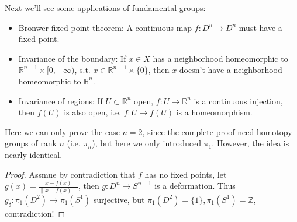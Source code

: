 Next we'll see some applications of fundamental groups:
\begin{itemize}
	\item Bronwer fixed point theorem: A continuous map $f: D^n \to D^n$ must
		have a fixed point.
	\item Invariance of the boundary: If $x\in X$ has a neighborhood homeomorphic
		to $\mathbb{R}^{n-1}\times [0, +\infty)$, s.t.
		$x\in \mathbb{R}^{n-1} \times \{0\}$, then $x$ doesn't have a neighborhood
		homeomorphic to $\mathbb{R}^{n}$.
	\item Invariance of regions: If $U \subset \mathbb{R}^{n}$ open,
		$f: U\to \mathbb{R}^{n}$ is a continuous injection,
		then $f(U)$ is also open, i.e. $f: U\to f(U)$ is a homeomorphism.
\end{itemize}

Here we can only prove the case $n = 2$, since the complete proof
need homotopy groups of rank $n$ (i.e. $\pi_n$), but here we only introduced $\pi_1$.
However, the idea is nearly identical.

\begin{proof}[Proof]
    Assmue by contradiction that $f$ has no fixed points,
	let $g(x) = \frac{x-f(x)}{\lVert x - f(x) \rVert}$,
	then $g: D^n \to S^{n-1}$ is a deformation.
	Thus $g_\sharp: \pi_1(D^2) \to \pi_1(S^1)$ surjective,
	but $\pi_1(D^2) = \{1\}, \pi_1(S^1) = \mathbb{Z}$, contradiction!
\end{proof}
